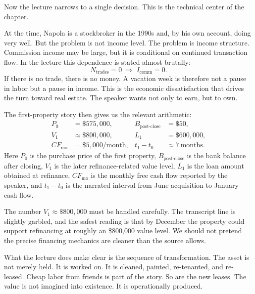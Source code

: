 Now the lecture narrows to a single decision. This is the technical center of the chapter.

At the time, Napola is a stockbroker in the 1990s and, by his own account, doing very well. But the problem is not income level. The problem is income structure. Commission income may be large, but it is conditional on continued transaction flow. In the lecture this dependence is stated almost brutally:
\begin{equation}
N_{\text{trades}} = 0 \;\Rightarrow\; I_{\text{comm}} = 0.
\end{equation}
If there is no trade, there is no money. A vacation week is therefore not a pause in labor but a pause in income. This is the economic dissatisfaction that drives the turn toward real estate. The speaker wants not only to earn, but to own.

The first-property story then gives us the relevant arithmetic:
\begin{align}
P_0 &= \$575{,}000, &
B_{\text{post-close}} &= \$50, \\
V_1 &\approx \$800{,}000, &
L_1 &= \$600{,}000, \\
CF_{\text{mo}} &= \$5{,}000/\text{month}, &
t_1-t_0 &\approx 7\ \text{months}.
\end{align}
Here \(P_0\) is the purchase price of the first property, \(B_{\text{post-close}}\) is the bank balance after closing, \(V_1\) is the later refinance-related value level, \(L_1\) is the loan amount obtained at refinance, \(CF_{\text{mo}}\) is the monthly free cash flow reported by the speaker, and \(t_1-t_0\) is the narrated interval from June acquisition to January cash flow.

The number \(V_1 \approx \$800{,}000\) must be handled carefully. The transcript line is slightly garbled, and the safest reading is that by December the property could support refinancing at roughly an \$800,000 value level. We should not pretend the precise financing mechanics are cleaner than the source allows.

What the lecture does make clear is the sequence of transformation. The asset is not merely held. It is worked on. It is cleaned, painted, re-tenanted, and re-leased. Cheap labor from friends is part of the story. So are the new leases. The value is not imagined into existence. It is operationally produced.

